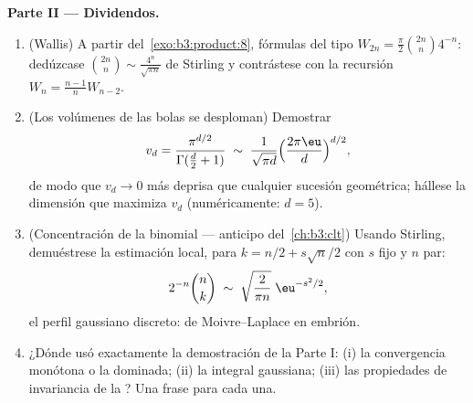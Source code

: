 \begin{problem}
\medskip
\noindent\textbf{Parte II --- Dividendos.}
\begin{enumerate}[resume]
  \item (Wallis) A partir del~\cref{exo:b3:product:8}, fórmulas del tipo
  $W_{2n} =
        \frac\pi2\binom{2n}n4^{-n}$: dedúzcase
  $\binom{2n}{n} \sim \frac{4^n}{\sqrt{\pi n}}$ de Stirling y
  contrástese con la recursión $W_{n} =
        \frac{n-1}nW_{n-2}$. \item (Los volúmenes de las bolas se
  desploman) Demostrar
        \[
        v_d = \frac{\pi^{d/2}}{\Gamma(\frac d2 + 1)}
        \;\sim\; \frac{1}{\sqrt{\pi d}}
        \Bigl(\frac{2\pi\eu}{d}\Bigr)^{d/2},
        \]
        de modo que $v_d \to 0$ más deprisa que cualquier sucesión
        geométrica; hállese la dimensión que maximiza $v_d$
        (numéricamente: $d =
        5$). \item (Concentración de la binomial --- anticipo
        del~\cref{ch:b3:clt}) Usando Stirling, demuéstrese la estimación
        local, para $k = n/2 + s\sqrt n/2$ con $s$ fijo y $n$ par:
        \[
        2^{-n}\binom{n}{k} \;\sim\;
        \sqrt{\frac{2}{\pi n}}\;\eu^{-s^2/2},
        \]
        el perfil gaussiano discreto: de Moivre--Laplace en embrión.
        \item ¿Dónde usó exactamente la demostración de la Parte I: (i)
        la convergencia monótona o la dominada; (ii) la integral
        gaussiana; (iii) las propiedades de invariancia de la
        ? Una
        frase para cada una.
\end{enumerate}


\end{problem}
